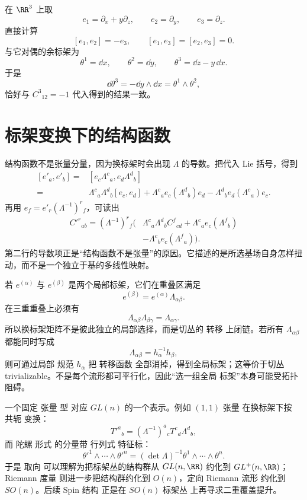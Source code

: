 \begin{exbox}[一个简单的非坐标标架]
在 $\RR^3$ 上取
\[
e_1=\partial_x+y\partial_z,
\qquad
e_2=\partial_y,
\qquad
e_3=\partial_z.
\]
直接计算
\[
[e_1,e_2]=-e_3,
\qquad
[e_1,e_3]=[e_2,e_3]=0.
\]
与它对偶的余标架为
\[
\theta^1=\dd x,
\qquad
\theta^2=\dd y,
\qquad
\theta^3=\dd z-y\,\dd x.
\]
于是
\[
\dd\theta^3
=-\dd y\wedge\dd x
=\theta^1\wedge\theta^2,
\]
恰好与 $C^3{}_{12}=-1$ 代入得到的结果一致。
\end{exbox}

\section{标架变换下的结构函数}
结构函数不是张量分量，因为换标架时会出现 $\Lambda$ 的导数。把代入 Lie 括号，得到
\[
\begin{aligned}
[e'_a,e'_b]
={}&[e_c\Lambda^c{}_a,e_d\Lambda^d{}_b]\\
={}&\Lambda^c{}_a\Lambda^d{}_b[e_c,e_d]
+\Lambda^c{}_a e_c(\Lambda^d{}_b)e_d
-\Lambda^d{}_b e_d(\Lambda^c{}_a)e_c.
\end{aligned}
\]
再用 $e_f=e'_r(\Lambda^{-1})^r{}_f$，可读出
\begin{align*}
C'^r{}_{ab}
=(\Lambda^{-1})^r{}_f\bigl(&\Lambda^c{}_a\Lambda^d{}_b C^f{}_{cd}
+\Lambda^c{}_a e_c(\Lambda^f{}_b)\\
&-\Lambda^c{}_b e_c(\Lambda^f{}_a)\bigr).
\end{align*}
第二行的导数项正是“结构函数不是张量”的原因。它描述的是所选基场自身怎样扭动，而不是一个独立于基的多线性映射。

若 $e^{(\alpha)}$ 与 $e^{(\beta)}$ 是两个局部标架，它们在重叠区满足
\[
e^{(\beta)}=e^{(\alpha)}\Lambda_{\alpha\beta}.
\]
在三重重叠上必须有
\begin{equation*}\Lambda_{\alpha\beta}\Lambda_{\beta\gamma}
=\Lambda_{\alpha\gamma}.\end{equation*}
所以换标架矩阵不是彼此独立的局部选择，而是切丛的 转移 上闭链。若所有 $\Lambda_{\alpha\beta}$ 都能同时写成
\[
\Lambda_{\alpha\beta}=h_\alpha^{-1}h_\beta,
\]
则可通过局部 规范 $h_\alpha$ 把 转移函数 全部消掉，得到全局标架；这等价于切丛 trivializable。不是每个流形都可平行化，因此“选一组全局 标架”本身可能受拓扑阻碍。

一个固定 张量 型 对应 $GL(n)$ 的一个表示。例如 $(1,1)$ 张量 在换标架下按 共轭 变换：
\[
T'^a{}_b
=(\Lambda^{-1})^a{}_cT^c{}_d\Lambda^d{}_b,
\]
而 陀螺 形式 的分量带 行列式 特征标：
\[
\theta'^1\wedge\cdots\wedge\theta'^n
=(\det\Lambda)^{-1}
\theta^1\wedge\cdots\wedge\theta^n.
\]
于是 取向 可以理解为把标架丛的结构群从 $GL(n,\RR)$ 约化到 $GL^+(n,\RR)$；Riemann 度量 则进一步把结构群约化到 $O(n)$，定向 Riemann 流形 约化到 $SO(n)$。后续 Spin 结构 正是在 $SO(n)$ 标架丛 上再寻求二重覆盖提升。

